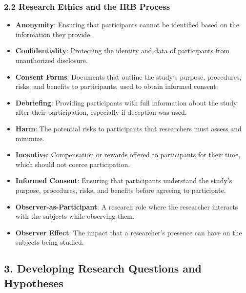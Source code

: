 \documentclass[
]{book}
\providecommand{\tightlist}{%
  \setlength{\itemsep}{0pt}\setlength{\parskip}{0pt}}
\begin{document}
\subsubsection*{\texorpdfstring{\textbf{2.2 Research Ethics and the IRB Process}}{2.2 Research Ethics and the IRB Process}}\label{research-ethics-and-the-irb-process}

\begin{itemize}
\tightlist
\item
  \textbf{Anonymity}: Ensuring that participants cannot be identified based on the information they provide.
\item
  \textbf{Confidentiality}: Protecting the identity and data of participants from unauthorized disclosure.
\item
  \textbf{Consent Forms}: Documents that outline the study's purpose, procedures, risks, and benefits to participants, used to obtain informed consent.
\item
  \textbf{Debriefing}: Providing participants with full information about the study after their participation, especially if deception was used.
\item
  \textbf{Harm}: The potential risks to participants that researchers must assess and minimize.
\item
  \textbf{Incentive}: Compensation or rewards offered to participants for their time, which should not coerce participation.
\item
  \textbf{Informed Consent}: Ensuring that participants understand the study's purpose, procedures, risks, and benefits before agreeing to participate.
\item
  \textbf{Observer-as-Participant}: A research role where the researcher interacts with the subjects while observing them.
\item
  \textbf{Observer Effect}: The impact that a researcher's presence can have on the subjects being studied.
\end{itemize}

\subsection*{\texorpdfstring{3. \textbf{Developing Research Questions and Hypotheses}}{3. Developing Research Questions and Hypotheses}}\label{developing-research-questions-and-hypotheses}
\end{document}
